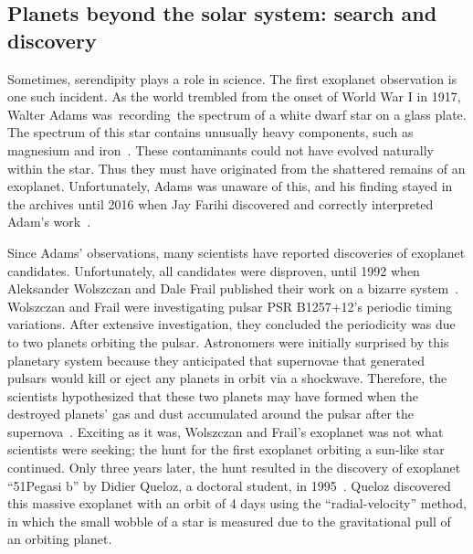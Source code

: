 \subsection{Planets beyond the solar system: search and discovery}
Sometimes, serendipity plays a role in science.
The first  exoplanet observation is one such incident.
As the world trembled from the onset of World War I in 1917, Walter Adams was recording the spectrum of a white dwarf star on a glass plate.
The spectrum of this star contains unusually heavy components, such as magnesium and iron~\cite{Farihi:2016:NewAR}.
These contaminants could not have evolved naturally within the star. 
Thus they must have originated from the shattered remains of an exoplanet.
Unfortunately, Adams was unaware of this, and his finding stayed in the archives until 2016 when Jay Farihi discovered and correctly interpreted Adam's work~\cite{Farihi:2016:NewAR}.

Since Adams' observations, many scientists have reported discoveries of exoplanet candidates.
Unfortunately, all candidates were disproven, until 1992 when Aleksander Wolszczan and Dale Frail published their work on a bizarre system~\cite{wolszczan1992planetary}. 
Wolszczan and Frail were investigating  pulsar PSR B1257+12's periodic timing variations.
After extensive investigation, they concluded the periodicity was due to two planets orbiting the pulsar. 
Astronomers were initially surprised by this planetary system because they anticipated that supernovae that generated pulsars would kill or eject any planets in orbit via a shockwave. 
Therefore, the scientists hypothesized that these two planets may have formed when the destroyed planets' gas and dust accumulated around the pulsar after the supernova~\cite{wolszczan1992planetary}.
Exciting as it was, Wolszczan and Frail's exoplanet was not what scientists were seeking; the hunt for the first exoplanet orbiting a sun-like star continued.
Only three years later, the hunt resulted in the discovery of exoplanet ``51Pegasi b'' by Didier Queloz, a doctoral student, in 1995~\cite{mayor1995jupiter}.
Queloz discovered this massive exoplanet with an orbit of 4 days using the ``radial-velocity'' method, in which the small wobble of a star is measured due to the gravitational pull of an orbiting planet. 


